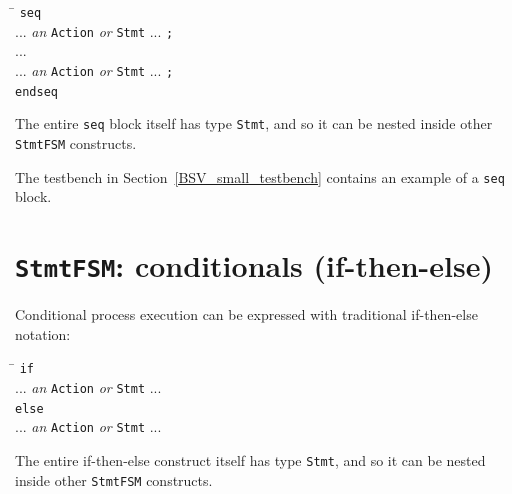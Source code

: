 \begin{tabbing}
\hmm \= \hm \kill
\hmm \> {\tt seq} \\
     \> \hm    ... \emph{an} {\tt Action} \emph{or} {\tt Stmt} ... {\tt ;} \\
     \> \hm    ... \\
     \> \hm    ... \emph{an} {\tt Action} \emph{or} {\tt Stmt} ... {\tt ;} \\
     \> {\tt endseq}
\end{tabbing}


The entire \verb|seq| block itself has type \verb|Stmt|, and so it can
be nested inside other \verb|StmtFSM| constructs.

The testbench in Section~\ref{BSV_small_testbench} contains an example
of a \verb|seq| block.


\section{{\tt StmtFSM}: conditionals (if-then-else)}


Conditional process execution can be expressed with traditional
if-then-else notation:

\begin{tabbing}
\hmm \= \hm \kill
\hmm \> {\tt if} \\
     \> \hm    ... \emph{an} {\tt Action} \emph{or} {\tt Stmt} ... \\
     \> {\tt else} \\
     \> \hm    ... \emph{an} {\tt Action} \emph{or} {\tt Stmt} ... \\
\end{tabbing}

The entire if-then-else construct itself has type \verb|Stmt|, and so
it can be nested inside other \verb|StmtFSM| constructs.

\vspace{2ex}

